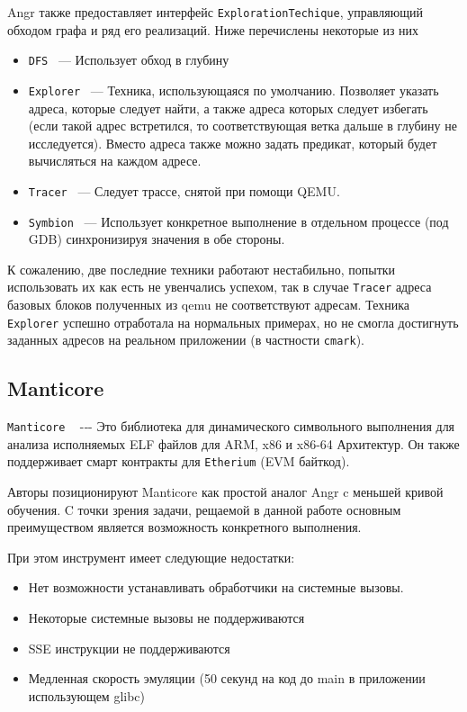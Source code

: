 Angr также предоставляет интерфейс \texttt{ExplorationTechique}, управляющий обходом графа и ряд его реализаций. Ниже перечислены некоторые из них

\begin{itemize}
    \item \texttt{DFS} ~--- Использует обход в глубину
    \item \texttt{Explorer} ~--- Техника, использующаяся по умолчанию. Позволяет указать адреса, которые следует найти, а также адреса которых следует избегать (если такой адрес встретился, то соответствующая ветка дальше в глубину не исследуется). Вместо адреса также можно задать предикат, который будет вычисляться на каждом адресе.
    \item \texttt{Tracer} ~--- Следует трассе, снятой при помощи QEMU.
    \item \texttt{Symbion} ~--- Использует конкретное выполнение в отдельном процессе (под GDB) синхронизируя значения в обе стороны.
\end{itemize}

К сожалению, две последние техники работают нестабильно, попытки использовать их как есть не увенчались успехом, так в случае \texttt{Tracer} адреса базовых блоков полученных из qemu не соответствуют адресам. Техника \texttt{Explorer} успешно отработала на нормальных примерах, но не смогла достигнуть заданных адресов на реальном приложении (в частности \texttt{cmark}).


\subsection{Manticore}

\texttt{Manticore} \cite{trailofbits-manticore}~ -‑- Это библиотека для динамического символьного выполнения для анализа исполняемых ELF файлов для ARM, x86 и x86-64 Архитектур. Он также поддерживает смарт контракты для \texttt{Etherium} (EVM байткод).

Авторы позиционируют Manticore как простой аналог Angr c меньшей кривой обучения. C точки зрения задачи, рещаемой в данной работе основным преимуществом является возможность конкретного выполнения.

При этом инструмент имеет следующие недостатки:

\begin{itemize}
    \item Нет возможности устанавливать обработчики на системные вызовы.
    \item Некоторые системные вызовы не поддерживаются
    \item SSE инструкции не поддерживаются
    \item Медленная скорость эмуляции (50 секунд на код до main в приложении использующем glibc)
\end{itemize}
